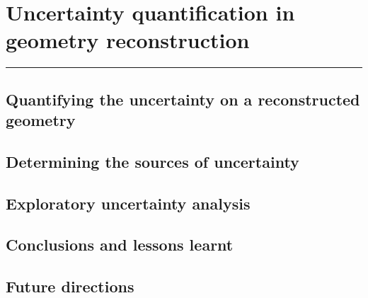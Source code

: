 \chapter{Uncertainty quantification in geometry reconstruction} \label{ch:uncertainty}

\vspace{-1.5 em}
\begin{addmargin}[-0.5cm]{0cm}
  \minitoc
\end{addmargin}
\hrule
\vspace{1.5 em}

\section{Quantifying the uncertainty on a reconstructed geometry}

\section{Determining the sources of uncertainty}

\section{Exploratory uncertainty analysis}

\section{Conclusions and lessons learnt}

\section{Future directions}